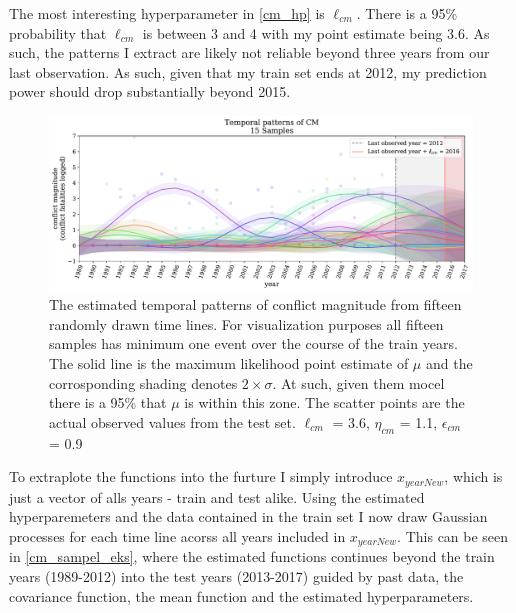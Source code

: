 \documentclass[a4paper]{article}
\begin{document}
The most interesting hyperparameter in \autoref{cm_hp} is $\ell_{cm}$. There is a 95\% probability that $\ell_{cm}$ is between 3 and 4 with my point estimate being 3.6. As such, the patterns I extract are likely not reliable beyond three years from our last observation. As such, given that my train set ends at 2012, my prediction power should drop substantially beyond 2015.\par




\begin{figure}[!htb]
	\centering
	\includegraphics[scale=0.47]{cm_15_samples.pdf}
    \caption{\footnotesize{The estimated temporal patterns of conflict magnitude from fifteen randomly drawn time lines. For visualization purposes all fifteen samples has minimum one event over the course of the train years. The solid line is the maximum likelihood point estimate of $\mu$ and the corrosponding shading denotes $2\times\sigma$. At such, given them mocel there is a 95\% that $\mu$ is within this zone. The scatter points are the actual observed values from the test set. $\ell_{cm}$ = 3.6, $\eta_{cm}$ = 1.1, $\epsilon_{cm}$ = 0.9}\label{cm_sampel_eks}}
\end{figure}

To extraplote the functions into the furture I simply introduce $x_{yearNew}$, which is just a vector of alls years - train and test alike. Using the estimated hyperparemeters and the data contained in the train set I now draw Gaussian processes for each time line acorss all years included in $x_{yearNew}$. This can be seen in \autoref{cm_sampel_eks}, where the estimated functions continues beyond the train years (1989-2012) into the test years (2013-2017) guided by past data, the covariance function, the mean function and the estimated hyperparameters.\par
\end{document}
